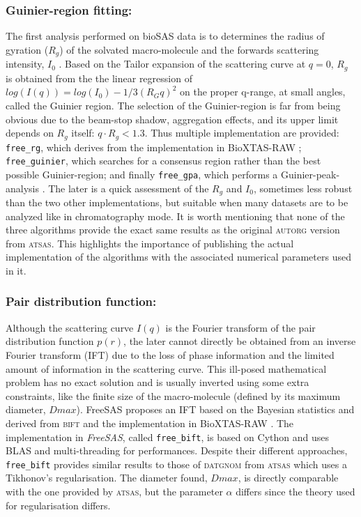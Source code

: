 \documentclass[preprint]{iucr}              %
\begin{document}
\subsubsection{Guinier-region fitting:}
The first analysis performed on bioSAS data is to determines the radius of gyration ($R_g$) of the solvated macro-molecule and the forwards scattering intensity, $I_0$ \cite{guinier}.
Based on the Tailor expansion of the scattering curve at $q=0$, $R_g$ is obtained from the the linear regression of $log(I(q)) = log(I_0)-1/3 (R_{G}q)^{2}$ on the proper q-range, at small angles, called the Guinier region.
The selection of the Guinier-region is far from being obvious due to the beam-stop shadow, aggregation effects, and its upper limit depends on $R_g$ itself: $q \cdot R_g<1.3$.
Thus multiple implementation are provided: \texttt{free\_rg}, which derives from the implementation in BioXTAS-RAW \cite{bioxtasraw}; \texttt{free\_guinier}, which searches for a consensus region rather than the best possible Guinier-region; and finally \texttt{free\_gpa}, which performs a Guinier-peak-analysis \cite{gpa}. 
The later is a quick assessment of the $R_g$ and $I_0$, sometimes less robust than the two other implementations, but suitable when many datasets are to be analyzed like in chromatography mode.
It is worth mentioning that none of the three algorithms provide the exact same results as the original \textsc{autorg} \cite{ATSAS2} version from \textsc{atsas}. 
This highlights the importance of publishing the actual implementation of the algorithms with the associated numerical parameters used in it.
  
\subsubsection{Pair distribution function:}
Although the scattering curve $I(q)$ is the Fourier transform of the pair distribution function $p(r)$, the later cannot directly be obtained from an inverse Fourier transform (IFT) due to the loss of phase information and the limited amount of information in the scattering curve. 
This ill-posed mathematical problem has no exact solution and is usually inverted using some extra constraints, like the finite size of the macro-molecule (defined by its maximum diameter, $Dmax$).    
FreeSAS proposes an IFT based on the Bayesian statistics and derived from \textsc{bift} \cite{bift} and the implementation in BioXTAS-RAW \cite{BioXTAS}.
The implementation in \textit{FreeSAS}, called \texttt{free\_bift}, is based on Cython \cite{cython} and uses BLAS\cite{blas} and multi-threading for performances.
Despite their different approaches, \texttt{free\_bift} provides similar results to those of \textsc{datgnom} \cite{ATSAS1} from \textsc{atsas} which uses a Tikhonov's regularisation.
The diameter found, $Dmax$, is directly comparable with the one provided by \textsc{atsas}, but the parameter $\alpha$ differs since the theory used for regularisation differs. 
\end{document}
